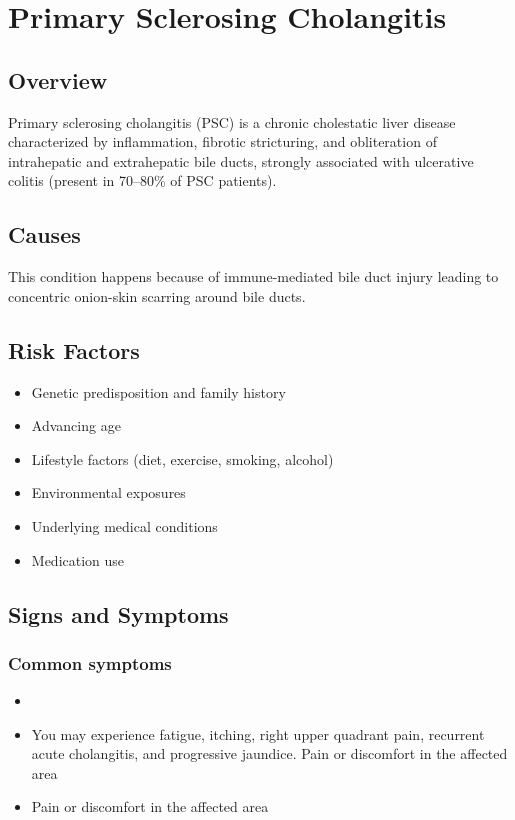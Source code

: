 \chapter{Primary Sclerosing Cholangitis}
\label{sec:Primary Sclerosing Cholangitis}

\section{Overview}
Primary sclerosing cholangitis (PSC) is a chronic cholestatic liver disease characterized by inflammation, fibrotic stricturing, and obliteration of intrahepatic and extrahepatic bile ducts, strongly associated with ulcerative colitis (present in 70--80\% of PSC patients).
\section{Causes}
This condition happens because of immune-mediated bile duct injury leading to concentric onion-skin scarring around bile ducts.     
\section{Risk Factors}

\begin{itemize}[noitemsep]
  \item Genetic predisposition and family history
  \item Advancing age
  \item Lifestyle factors (diet, exercise, smoking, alcohol)
  \item Environmental exposures
  \item Underlying medical conditions
  \item Medication use
\end{itemize}
\section{Signs and Symptoms}

\subsection{Common symptoms}
\begin{itemize}[noitemsep]
  \item \item You may experience fatigue, itching, right upper quadrant pain, recurrent acute cholangitis, and progressive jaundice. Pain or discomfort in the affected area    \item Pain or discomfort in the affected area
  \end{itemize}


